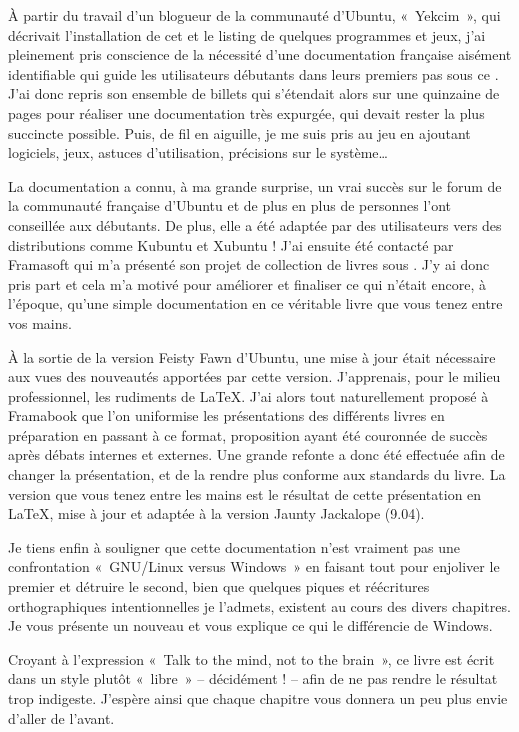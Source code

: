 À partir du travail d'un blogueur de la communauté d'Ubuntu, «~Yekcim~», qui décrivait l'installation de cet  et le listing de quelques programmes et jeux, j'ai pleinement pris conscience de la nécessité d'une documentation française aisément identifiable qui guide les utilisateurs débutants dans leurs premiers pas sous ce . J'ai donc repris son ensemble de billets qui s'étendait alors sur une quinzaine de pages pour réaliser une documentation très expurgée, qui devait rester la plus succincte possible. Puis, de fil en aiguille, je me suis pris au jeu en ajoutant logiciels, jeux, astuces d'utilisation, précisions sur le système\ldots{}\par
La documentation a connu, à ma grande surprise, un vrai succès sur le forum de la communauté française d'Ubuntu et de plus en plus de personnes l'ont conseillée aux débutants. De plus, elle a été adaptée par des utilisateurs vers des distributions comme Kubuntu et Xubuntu ! J'ai ensuite été contacté par Framasoft qui m'a présenté son projet de collection de livres sous . J'y ai donc pris part et cela m'a motivé pour améliorer et finaliser ce qui n'était encore, à l'époque, qu'une simple documentation en ce véritable livre que vous tenez entre vos mains.\par
À la sortie de la version Feisty Fawn d'Ubuntu, une mise à jour était nécessaire aux vues des nouveautés apportées par cette version. J'apprenais, pour le milieu professionnel, les rudiments de \LaTeX{}. J'ai alors tout naturellement proposé à Framabook que l'on uniformise les présentations des différents livres en préparation en passant à ce format, proposition ayant été couronnée de succès après débats internes et externes. Une grande refonte a donc été effectuée afin de changer la présentation, et de la rendre plus conforme aux standards du livre. La version que vous tenez entre les mains est le résultat de cette présentation en \LaTeX{}, mise à jour et adaptée à la version Jaunty Jackalope (9.04).\par
Je tiens enfin à souligner que cette documentation n'est vraiment pas une confrontation «~GNU/Linux versus Windows~» en faisant tout pour enjoliver le premier et détruire le second, bien que quelques piques et réécritures orthographiques intentionnelles je l'admets, existent au cours des divers chapitres. Je vous présente un nouveau  et vous explique ce qui le différencie de Windows.\par
Croyant à l'expression «~Talk to the mind, not to the brain~», ce livre est écrit dans un style plutôt «~libre~» -- décidément ! -- afin de ne pas rendre le résultat trop indigeste. J'espère ainsi que chaque chapitre vous donnera un peu plus envie d'aller de l'avant.\par
